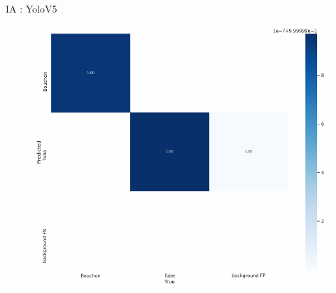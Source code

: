 \begin{frame}[allowframebreaks]{IA : YoloV5}
            \begin{figure}[H]
                \centering
                \includegraphics[width=.7\linewidth]{images/matriceConfusion.png}
            \end{figure}
            
            
        \end{frame}
%
